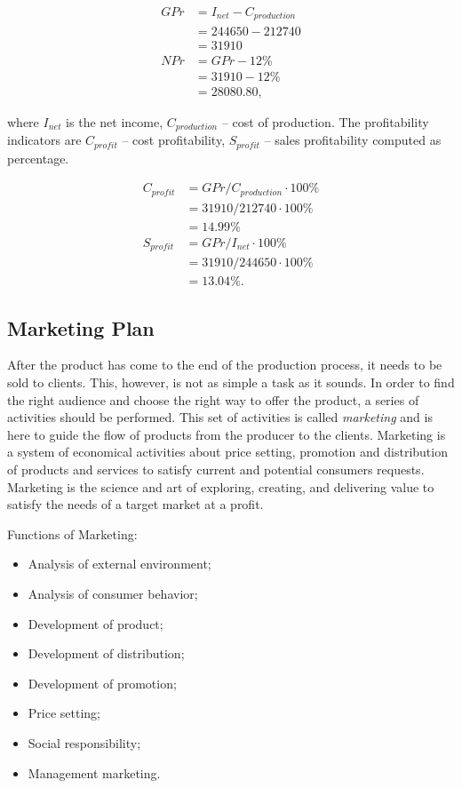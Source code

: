 \begin{equation}
 \begin{split}
GPr &= I_{net} - C_{production}\\
    &= 244650 - 212740\\
    &= 31910\\
NPr &= GPr - 12\% \\
    &= 31910 - 12\% \\
    &= 28080.80,
\end{split}
\end{equation}

\noindent where $I_{net}$ is the net income, $C_{production}$ -- cost of
production. The profitability indicators are $C_{profit}$ -- cost
profitability, $S_{profit}$ -- sales profitability computed as percentage.

\begin{equation}
 \begin{split}
  C_{profit} &= GPr / C_{production} \cdot 100\%\\
              &= 31910 / 212740 \cdot 100\% \\
              &= 14.99 \%\\
  S_{profit} &= GPr / I_{net} \cdot 100\% \\
             &= 31910 / 244650 \cdot 100\% \\
             &= 13.04 \%.
 \end{split}
\end{equation}

\subsection{Marketing Plan}

After the product has come to the end of the production process, it needs to
be sold to clients. This, however, is not as simple a task as it sounds. In
order to find the right audience and choose the right way to offer the
product, a series of activities should be performed. This set of activities is
called \emph{marketing} and is here to guide the flow of products from the
producer to the clients. Marketing is a system of economical activities about
price setting, promotion and distribution of products and services to satisfy
current and potential consumers requests. Marketing is the science and art of
exploring, creating, and delivering value to satisfy the needs of a target
market at a profit.

Functions of Marketing:
\begin{itemize}
    \item Analysis of external environment;
    \item Analysis of consumer behavior;
    \item Development of product;
    \item Development of distribution;
    \item Development of promotion;
    \item Price setting;
    \item Social responsibility;
    \item Management marketing.
\end{itemize}

